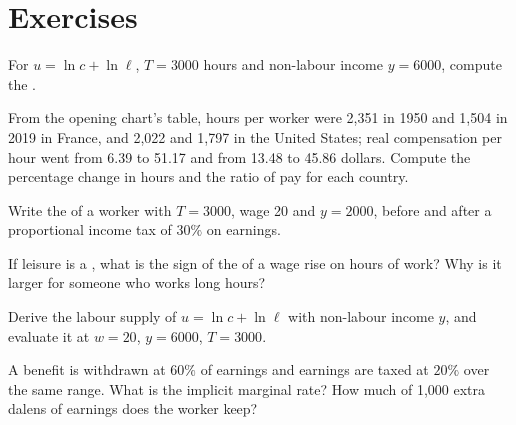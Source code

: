 \section*{Exercises}\label{sec:b1:labour-supply-and-saving:exercises}

\begin{exercise}[$\star$]\label{exo:b1:labour-supply-and-saving:reservation}
For $u = \ln c + \ln\ell$, $T = 3000$ hours and non-labour income $y = 6000$,
compute the .
\end{exercise}

\begin{exercise}[$\star$]\label{exo:b1:labour-supply-and-saving:read}
From the opening chart's table, hours per worker were 2,351 in 1950 and
1,504 in 2019 in France, and 2,022 and 1,797 in the United States; real
compensation per hour went from 6.39 to 51.17 and from 13.48 to 45.86
dollars. %
Compute the percentage change in hours and the ratio of pay for each
country.
\end{exercise}

\begin{exercise}[$\star$]\label{exo:b1:labour-supply-and-saving:tax}
Write the  of a worker with $T = 3000$, wage 20 and $y = 2000$, before
and after a proportional income tax of $30\%$ on earnings.
\end{exercise}

\begin{exercise}[$\star$]\label{exo:b1:labour-supply-and-saving:income-sign}
If leisure is a , what is the sign of the  of a wage
rise on hours of work? Why is it larger for someone who works long hours?
\end{exercise}

\begin{exercise}[$\star\star$]\label{exo:b1:labour-supply-and-saving:log}
Derive the labour supply of $u = \ln c + \ln\ell$ with non-labour income $y$, and
evaluate it at $w = 20$, $y = 6000$, $T = 3000$.
\end{exercise}

\begin{exercise}[$\star\star$]\label{exo:b1:labour-supply-and-saving:implicit}
A benefit is withdrawn at $60\%$ of earnings and earnings are taxed at $20\%$
over the same range. What is the implicit marginal rate? How much of 1,000
extra dalens of earnings does the worker keep?
\end{exercise}

